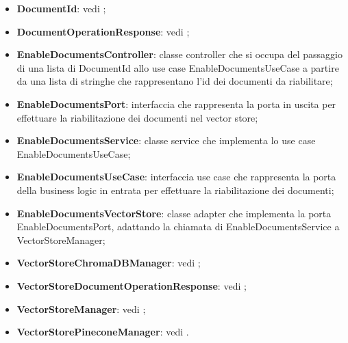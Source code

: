 \documentclass[10pt, a4paper]{article}
\begin{document}
\begin{itemize}
    \item \textbf{DocumentId}: vedi ;
    \item \textbf{DocumentOperationResponse}: vedi ;
    \item \label{EnableDocumentsController}\textbf{EnableDocumentsController}: classe controller che si occupa del passaggio di una lista di DocumentId allo use case EnableDocumentsUseCase a partire da una lista di stringhe che rappresentano l'id dei documenti da riabilitare;
    \item \label{EnableDocumentsPort}\textbf{EnableDocumentsPort}: interfaccia che rappresenta la porta in uscita per effettuare la riabilitazione dei documenti nel vector store;
    \item \label{EnableDocumentsService}\textbf{EnableDocumentsService}: classe service che implementa lo use case EnableDocumentsUseCase;
    \item \label{EnableDocumentsUseCase}\textbf{EnableDocumentsUseCase}: interfaccia use case che rappresenta la porta della business logic in entrata per effettuare la riabilitazione dei documenti;
    \item \label{EnableDocumentsVectorStore}\textbf{EnableDocumentsVectorStore}: classe adapter che implementa la porta EnableDocumentsPort, adattando la chiamata di EnableDocumentsService a VectorStoreManager;
    \item \textbf{VectorStoreChromaDBManager}: vedi ;
    \item \textbf{VectorStoreDocumentOperationResponse}: vedi ;
    \item \textbf{VectorStoreManager}: vedi ;
    \item \textbf{VectorStorePineconeManager}: vedi .
    
\end{itemize}
\end{document}
